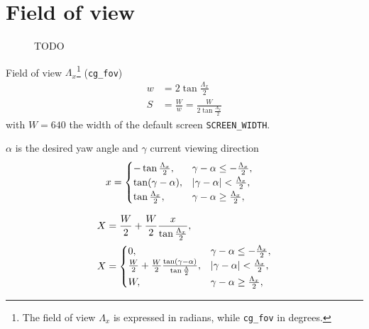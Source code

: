 \section{Field of view}
\label{app:fov}

\begin{figure}[H]
	\centering
	\begin{subfigure}[t]{.5\textwidth}
		\centering
		\setlength\figureheight{5.5cm}
		\setlength\figurewidth{5.5cm}
		\caption{}
	\end{subfigure}%
	\begin{subfigure}[t]{.5\textwidth}
		\centering
		\setlength\figureheight{5.5cm}
		\setlength\figurewidth{5.5cm}
		\caption{}
	\end{subfigure}%
	\caption{TODO}
	\label{fig:fov}
\end{figure}
Field of view $\Lambda_x$\footnote{The field of view $\Lambda_x$ is expressed in radians, while \texttt{cg\_fov} in degrees.} (\texttt{cg\_fov})
\begin{align*}
w &= 2\tan\frac{\Lambda_x}{2}\\
S &= \frac{W}{w} = \frac{W}{2\tan\frac{\Lambda_x}{2}}
\end{align*}
with $W = 640$ the width of the default screen \texttt{SCREEN\_WIDTH}.

$\alpha$ is the desired yaw angle and $\gamma$ current viewing direction
\begin{align*}
x &=
\begin{cases}
-\tan\frac{\Lambda_x}{2}, & \gamma - \alpha  \le -\frac{\Lambda_x}{2}, \\
\tan(\gamma - \alpha), & \left\lvert\gamma - \alpha\right\rvert < \frac{\Lambda_x}{2},\\
\tan\frac{\Lambda_x}{2}, & \gamma - \alpha \ge \frac{\Lambda_x}{2},
\end{cases}
\end{align*}

\begin{align*}
X &= \frac{W}{2} + \frac{W}{2}\frac{x}{\tan\frac{\Lambda_x}{2}},\\
X &=
\begin{cases}
0, & \gamma - \alpha  \le -\frac{\Lambda_x}{2}, \\
\frac{W}{2} + \frac{W}{2}\frac{\tan(\gamma - \alpha)}{\tan\frac{\Lambda}{2}}, & \left\lvert\gamma - \alpha\right\rvert < \frac{\Lambda_x}{2},\\
W, & \gamma - \alpha \ge \frac{\Lambda_x}{2},
\end{cases}
\end{align*}

